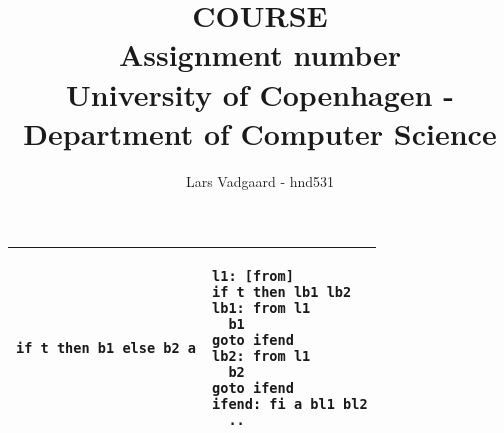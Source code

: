 \documentclass[12pt,a4paper]{article}
\title{
    \vspace{5cm}
    \Huge{COURSE \\ }
    \Large{Assignment number}
    \linebreak \\
    University of Copenhagen - Department of Computer Science \\
}
\author{
    \Large{Lars Vadgaard - hnd531}
}
\begin{document}

\clearpage\maketitle
\thispagestyle{empty}

\newpage
\setcounter{page}{1}

\begin{tabular}{|p{7cm}|p{7cm}|}
  \hline

\begin{lstlisting}
if t then b1 else b2 a
\end{lstlisting}
&
\begin{lstlisting}
l1: [from]
if t then lb1 lb2
lb1: from l1
  b1
goto ifend
lb2: from l1
  b2
goto ifend
ifend: fi a bl1 bl2
  ..
\end{lstlisting}
\\

  \hline
\end{tabular}
\end{document}
